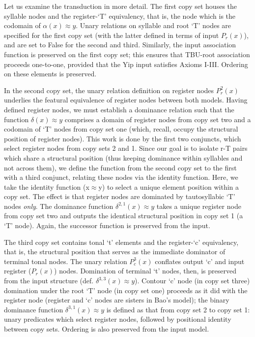 \documentclass{article}
\newcommand{\ap}{\approx}
\begin{document}
Let us examine the transduction in more detail. The first copy set houses the syllable nodes and the register-`T' equivalency, that is, the node which is the codomain of $\alpha(x)\ap y$. Unary relations on syllable and root `T' nodes are specified for the first copy set (with the latter defined in terms of input $P_{r}(x)$), and are set to False for the second and third. Similarly, the input association function is preserved on the first copy set; this ensures that TBU-root association proceeds one-to-one, provided that the Yip input satisfies Axioms I-III. Ordering on these elements is preserved. \par
In the second copy set, the unary relation definition on register nodes $P^{2}_{r}(x)$ underlies the featural equivalence of register nodes between both models. Having defined register nodes, we must establish a dominance relation such that the function $\delta(x)\ap y$ comprises a domain of register nodes from copy set two and a codomain of `T' nodes from copy set one (which, recall, occupy the structural position of register nodes). This work is done by the first two conjuncts, which select register nodes from copy sets 2 and 1. Since our goal is to isolate r-T pairs which share a structural position (thus keeping dominance within syllables and not across them), we define the function from the second copy set to the first with a third conjunct, relating these nodes via the identity function. Here, we take the identity function (x$\ap$y) to select a unique element position within a copy set. The effect is that register nodes are dominated by tautosyllabic `T' nodes \emph{only}. The dominance function $\delta^{2,1}(x)\ap y$ takes a unique register node from copy set two and outputs the identical structural position in copy set 1 (a `T' node). Again, the successor function is preserved from the input.\par
The third copy set contains tonal `t' elements and the register-`c' equivalency, that is, the structural position that serves as the immediate dominator of terminal tonal nodes. The unary relation $P^{3}_{c}(x)$ conflates output `c' and input register ($P_{r}(x)$) nodes. Domination of terminal `t' nodes, then, is preserved from the input structure (def. $\delta^{3,3}(x)\ap y$). Contour `c' node (in copy set three) domination under the root `T' node (in copy set one) proceeds as it did with the register node (register and `c' nodes are sisters in Bao's model); the binary dominance function $\delta^{3,1}(x)\ap y$ is defined as that from copy set 2 to copy set 1: unary predicates which select register nodes, followed by positional identity between copy sets. Ordering is also preserved from the input model. \par
\end{document}
